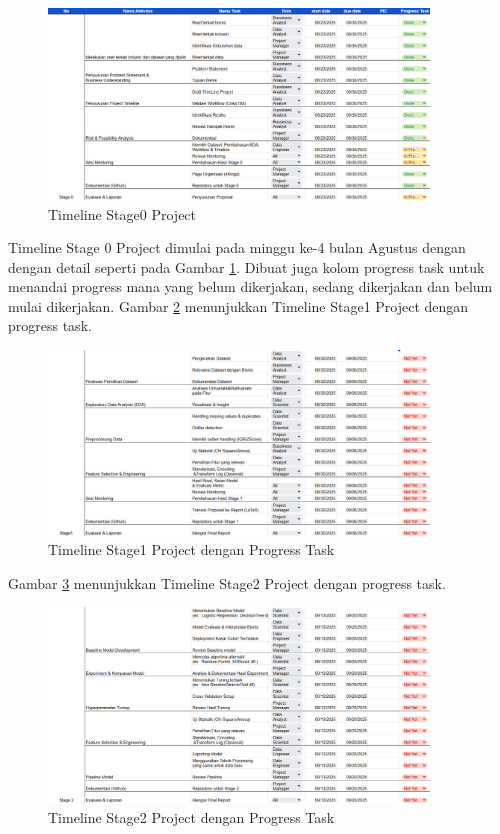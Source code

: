 \begin{figure}[H]
    \centering
    \includegraphics[width=0.9\textwidth]{gambar/timeline0.png}
    \caption{Timeline Stage0 Project}
    \label{fig:timeline0}
\end{figure}

Timeline Stage 0 Project dimulai pada minggu ke-4 bulan Agustus dengan dengan detail seperti pada Gambar \ref{fig:timeline0}. Dibuat juga kolom progress task untuk menandai progress mana yang belum dikerjakan, sedang dikerjakan dan belum mulai dikerjakan. Gambar \ref{fig:timeline1} menunjukkan Timeline Stage1 Project dengan progress task.

\begin{figure}[H]
    \centering
    \includegraphics[width=0.9\textwidth]{gambar/timeline1.png}
    \caption{Timeline Stage1 Project dengan Progress Task}
    \label{fig:timeline1}
\end{figure}

Gambar \ref{fig:timeline2} menunjukkan Timeline Stage2 Project dengan progress task.

\begin{figure}[H]
    \centering
    \includegraphics[width=0.9\textwidth]{gambar/timeline2.png}
    \caption{Timeline Stage2 Project dengan Progress Task}
    \label{fig:timeline2}
\end{figure}

